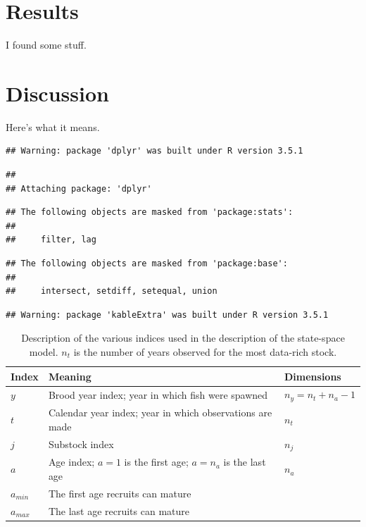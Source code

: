 \documentclass[12pt,]{book}
\theoremstyle{definition}
\theoremstyle{definition}
\theoremstyle{definition}
\theoremstyle{remark}
\begin{document}
\section{Results}\label{results}

I found some stuff.

\section{Discussion}\label{discussion}

Here's what it means.

\clearpage

\begin{verbatim}
## Warning: package 'dplyr' was built under R version 3.5.1
\end{verbatim}

\begin{verbatim}
## 
## Attaching package: 'dplyr'
\end{verbatim}

\begin{verbatim}
## The following objects are masked from 'package:stats':
## 
##     filter, lag
\end{verbatim}

\begin{verbatim}
## The following objects are masked from 'package:base':
## 
##     intersect, setdiff, setequal, union
\end{verbatim}

\begin{verbatim}
## Warning: package 'kableExtra' was built under R version 3.5.1
\end{verbatim}

\begin{table}

\caption{\label{tab:ch4-notation-table}Description of the various indices used in the description of the state-space model. $n_t$ is the number of years observed for the most data-rich stock.}
\centering
\begin{tabular}[t]{l>{\raggedright\arraybackslash}p{25em}>{\raggedright\arraybackslash}p{10em}}
\toprule
\textbf{Index} & \textbf{Meaning} & \textbf{Dimensions}\\
\midrule
$y$ & Brood year index; year in which fish were spawned & $n_y=n_t + n_a - 1$\\
$t$ & Calendar year index; year in which observations are made & $n_t$\\
$j$ & Substock index & $n_j$\\
$a$ & Age index; $a=1$ is the first age; $a=n_a$ is the last age & $n_a$\\
$a_{min}$ & The first age recruits can mature & 1\\
$a_{max}$ & The last age recruits can mature & 1\\
\bottomrule
\end{tabular}
\end{table}
\end{document}
